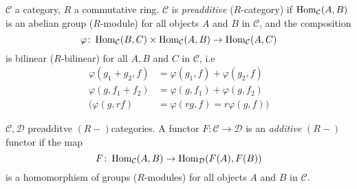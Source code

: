 
\begin{defin}
$\mathcal{C}$ a category, $R$ a commutative ring. $\mathcal{C}$ is \emph{preadditive} ($R$-category) if $\operatorname{Hom}_\mathcal{C}(A,B)$ is an abelian group ($R$-module) for all objects $A$ and $B$ in $\mathcal{C}$, and the composition \[ \varphi\colon  \operatorname{Hom}_\mathcal{C}(B,C) \times \operatorname{Hom}_\mathcal{C}(A,B) \to \operatorname{Hom}_\mathcal{C}(A,C) \] is bilinear ($R$-bilinear) for all $A,B$ and $C$ in $\mathcal{C}$, i.e
\begin{equation*}
\begin{split}
\varphi(g_1 + g_2, f) &= \varphi(g_1,f) + \varphi(g_2, f)\\
\varphi(g, f_1 + f_2) &= \varphi(g, f_1) + \varphi(g, f_2)\\
\Big(\varphi(g, rf) &= \varphi(rg, f) = r\varphi(g,f)\Big)
\end{split}
\end{equation*}
\end{defin}

\begin{defin}
$\mathcal{C}, \mathcal{D}$ preadditve $(R-)$categories. A functor $F\colon  \mathcal{C} \to \mathcal{D}$ is an \emph{additive} $(R-)$functor if the map \[ F\colon  \operatorname{Hom}_\mathcal{C}(A, B) \to \operatorname{Hom}_\mathcal{D}(F(A), F(B))\] is a homomorphism of groups ($R$-modules) for all objects $A$ and $B$ in $\mathcal{C}$.
\end{defin}

